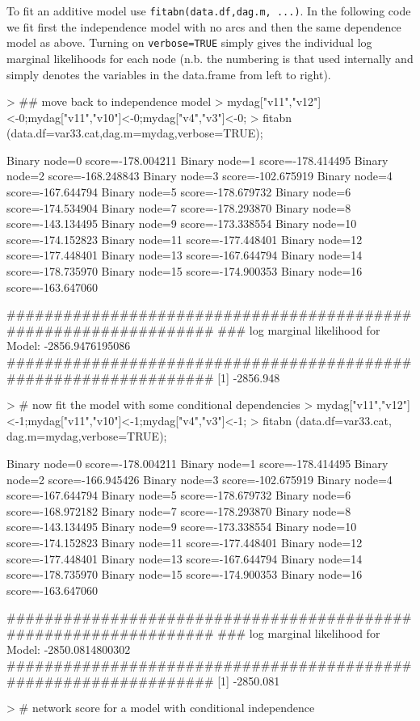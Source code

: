 \documentclass[nojss]{jss}
\begin{document}
To fit an additive model use {\tt fitabn(data.df,dag.m, ...)}. In the following code we fit first the independence model with no arcs and then the same dependence model as above. Turning on {\tt verbose=TRUE} simply gives the individual log marginal likelihoods for each node (n.b. the numbering is that used internally and simply denotes the variables in the data.frame from left to right).
\begin{Schunk}
\begin{Sinput}
> ## move back to independence model
> mydag["v11","v12"]<-0;mydag["v11","v10"]<-0;mydag["v4","v3"]<-0;
> fitabn (data.df=var33.cat,dag.m=mydag,verbose=TRUE);
\end{Sinput}
\begin{Soutput}
Binary node=0 score=-178.004211
Binary node=1 score=-178.414495
Binary node=2 score=-168.248843
Binary node=3 score=-102.675919
Binary node=4 score=-167.644794
Binary node=5 score=-178.679732
Binary node=6 score=-174.534904
Binary node=7 score=-178.293870
Binary node=8 score=-143.134495
Binary node=9 score=-173.338554
Binary node=10 score=-174.152823
Binary node=11 score=-177.448401
Binary node=12 score=-177.448401
Binary node=13 score=-167.644794
Binary node=14 score=-178.735970
Binary node=15 score=-174.900353
Binary node=16 score=-163.647060

   #################################################################
   ###      log marginal likelihood for Model: -2856.9476195086
   #################################################################
[1] -2856.948
\end{Soutput}
\begin{Sinput}
> # now fit the model with some conditional dependencies 
> mydag["v11","v12"]<-1;mydag["v11","v10"]<-1;mydag["v4","v3"]<-1;
> fitabn (data.df=var33.cat, dag.m=mydag,verbose=TRUE);
\end{Sinput}
\begin{Soutput}
Binary node=0 score=-178.004211
Binary node=1 score=-178.414495
Binary node=2 score=-166.945426
Binary node=3 score=-102.675919
Binary node=4 score=-167.644794
Binary node=5 score=-178.679732
Binary node=6 score=-168.972182
Binary node=7 score=-178.293870
Binary node=8 score=-143.134495
Binary node=9 score=-173.338554
Binary node=10 score=-174.152823
Binary node=11 score=-177.448401
Binary node=12 score=-177.448401
Binary node=13 score=-167.644794
Binary node=14 score=-178.735970
Binary node=15 score=-174.900353
Binary node=16 score=-163.647060

   #################################################################
   ###      log marginal likelihood for Model: -2850.0814800302
   #################################################################
[1] -2850.081
\end{Soutput}
\begin{Sinput}
> # network score for a model with conditional independence
\end{Sinput}
\end{Schunk}
\end{document}
